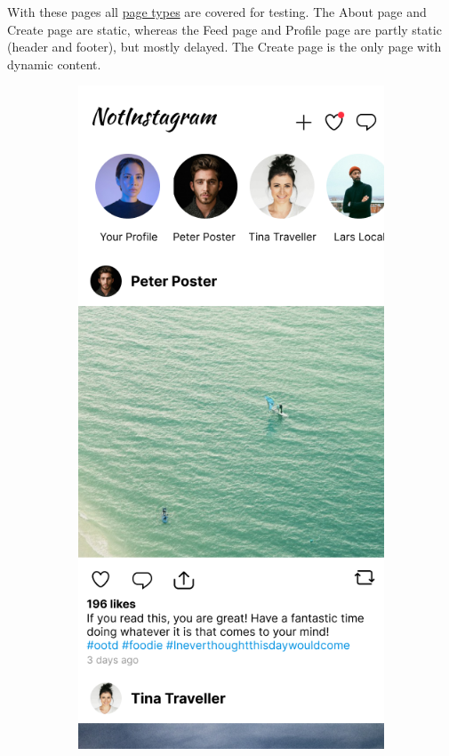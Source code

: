 \documentclass[a4paper, 10pt]{article}
\begin{document}
With these pages all \hyperref[enum:pagetypes]{page types} are covered for testing.
The About page and Create page are static, whereas the Feed page and Profile page are partly static (header and footer), but mostly delayed.
The Create page is the only page with dynamic content.

\begin{figure}[ht!]
  \begin{subfigure}{0.49\linewidth}
    \begin{center}
      \includegraphics[width=\linewidth, height=0.3\textheight, keepaspectratio]{img/ig-clone/Feed.png}

\end{center}
\end{subfigure}
\end{figure}
\end{document}
